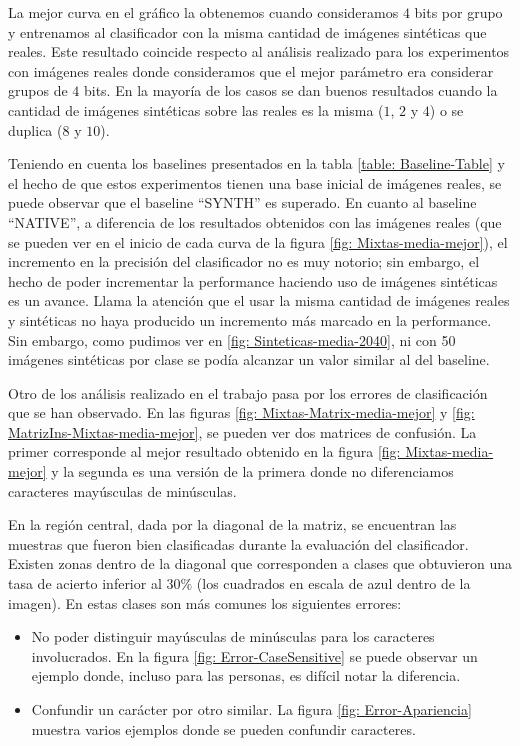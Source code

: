 	 La mejor curva en el gráfico la obtenemos cuando consideramos $4$ bits por grupo y entrenamos al clasificador con la misma cantidad de imágenes sintéticas que reales. Este resultado coincide respecto al análisis realizado para los experimentos con imágenes reales donde consideramos que el mejor parámetro era considerar grupos de $4$ bits. En la mayoría de los casos se dan buenos resultados cuando la cantidad de imágenes sintéticas sobre las reales es la misma ($1$, $2$ y $4$) o se duplica ($8$ y $10$).

	 Teniendo en cuenta los baselines presentados en la tabla \ref{table: Baseline-Table} y el hecho de que estos experimentos tienen una base inicial de imágenes reales, se puede observar que el baseline ``SYNTH'' es superado. En cuanto al baseline ``NATIVE'', a diferencia de los resultados obtenidos con las imágenes reales (que se pueden ver en el inicio de cada curva de la figura \ref{fig: Mixtas-media-mejor}), el incremento en la precisión del clasificador no es muy notorio; sin embargo, el hecho de poder incrementar la performance haciendo uso de imágenes sintéticas es un avance. Llama la atención que el usar la misma cantidad de imágenes reales y sintéticas no haya producido un incremento más marcado en la performance. Sin embargo, como pudimos ver en \ref{fig: Sinteticas-media-2040}, ni con 50 imágenes sintéticas por clase se podía alcanzar un valor similar al del baseline.

	Otro de los análisis realizado en el trabajo pasa por los errores de clasificación que se han observado. En las figuras \ref{fig: Mixtas-Matrix-media-mejor} y \ref{fig: MatrizIns-Mixtas-media-mejor}, se pueden ver dos matrices de confusión. La primer corresponde al mejor resultado obtenido en la figura \ref{fig: Mixtas-media-mejor} y la segunda es una versión de la primera donde no diferenciamos caracteres mayúsculas de minúsculas.

	En la región central, dada por la diagonal de la matriz, se encuentran las muestras que fueron bien clasificadas durante la evaluación del clasificador. Existen zonas dentro de la diagonal que corresponden a clases que obtuvieron una tasa de acierto inferior al $30\%$ (los cuadrados en escala de azul dentro de la imagen). En estas clases son más comunes los siguientes errores:

	\begin{itemize}
		\item No poder distinguir mayúsculas de minúsculas para los caracteres involucrados. En la figura \ref{fig: Error-CaseSensitive} se puede observar un ejemplo donde, incluso para las personas, es difícil notar la diferencia.
		\item Confundir un carácter por otro similar. La figura \ref{fig: Error-Apariencia} muestra varios ejemplos donde se pueden confundir caracteres.
	\end{itemize}

